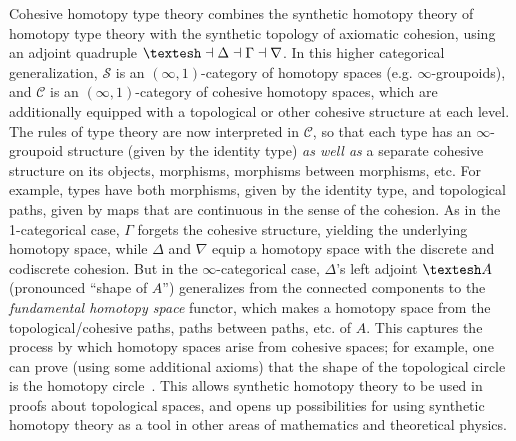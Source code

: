 \documentclass{drl-common/llncs}
\newcommand{\C}{\ensuremath{\mathcal{C}}}
\newcommand{\la}{\ensuremath{\dashv}}
\newcommand{\sh}{\text{\textesh}}
\begin{document}
Cohesive homotopy type theory combines the synthetic homotopy theory of
homotopy type theory with the synthetic topology of axiomatic cohesion,
using an adjoint quadruple $\sh \la \Delta \la \Gamma \la \nabla$.  In
this higher categorical generalization, $\mathcal{S}$ is an
$(\infty,1)$-category of homotopy spaces (e.g. $\infty$-groupoids), and
$\C$ is an $(\infty,1)$-category of cohesive homotopy spaces, which are
additionally equipped with a topological or other cohesive structure at
each level.  The rules of type theory are now interpreted in \C, so that
each type has an $\infty$-groupoid structure (given by the identity
type) \emph{as well as} a separate cohesive structure on its objects,
morphisms, morphisms between morphisms, etc.  For example, types have
both morphisms, given by the identity type, and topological paths, given
by maps that are continuous in the sense of the cohesion.  As in the
1-categorical case, $\Gamma$ forgets the cohesive structure, yielding
the underlying homotopy space, while $\Delta$ and $\nabla$ equip a
homotopy space with the discrete and codiscrete cohesion.  But in the
$\infty$-categorical case, $\Delta$'s left adjoint $\sh A$ (pronounced
``shape of $A$'') generalizes from the connected components to the
\emph{fundamental homotopy space} functor, which makes a homotopy space
from the topological/cohesive paths, paths between paths, etc. of $A$.
This captures the process by which homotopy spaces arise from cohesive
spaces; for example, one can prove (using some additional axioms) that
the shape of the topological circle is the homotopy
circle~\citep{shulman15realcohesion}.  This allows synthetic
homotopy theory to be used in proofs about topological spaces, and opens
up possibilities for using synthetic homotopy theory as a tool in other
areas of mathematics and theoretical physics.
\end{document}
